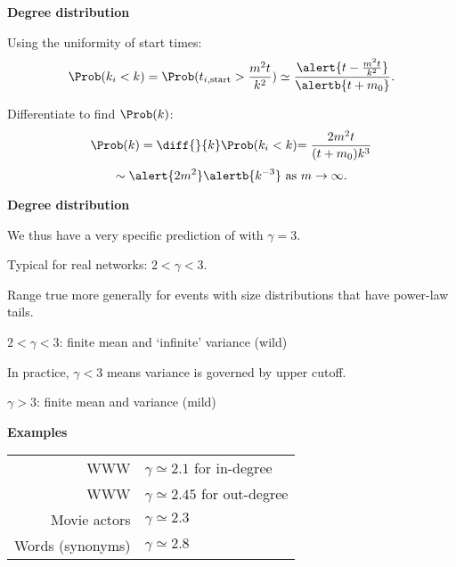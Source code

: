 \begin{frame}[label=]
\begin{frame}[label=]
\begin{frame}[label=]
\begin{frame}[label=]
\begin{frame}[label=]
\begin{frame}[label=]
\begin{frame}[label=]
\begin{frame}[label=]
\begin{frame}[label=]
\begin{frame}[label=]
 


\begin{frame}[label=]
  \textbf{Degree distribution}

  
   
    Using the uniformity of start times:
    $$
    \Prob(k_i < k)
    =
    \Prob(t_{i,\textnormal{start}} > \frac{m^2 t}{k^2})
    \simeq
    \frac{\alert{t-\frac{m^2 t}{k^2}}}{\alertb{t+m_0}}.
    $$
   
    Differentiate to find $\Prob(k)$:
    $$
    \Prob(k)
    = 
    \diff{}{k} \Prob(k_i < k)
    {
      =
      \frac{2m^2 t }{(t+m_0) k^3}
    }
    $$
    $$
    {
      \sim 
      \alert{2m^2} \alertb{k^{-3}}
      \mbox{\ as $m\rightarrow \infty$}.
    }
    $$
  


\begin{frame}[label=]
 \textbf{Degree distribution}

 
   
    We thus have a very specific prediction of 
     with \alert{$\gamma=3$}.
   
    Typical for real networks: \alert{$2 < \gamma < 3$}.
   
    Range true more generally for events with size
    distributions that have power-law tails.
  
    \alert{$2 < \gamma < 3$}: finite mean and `infinite' variance
    {\alert{(wild)}}
  
    In practice, $\gamma < 3$ means variance is governed
    by upper cutoff.
  
    \alert{$\gamma > 3$}: finite mean and variance 
    {\alert{(mild)}}
 


\begin{frame}[label=]
 \textbf{Examples}  

  \begin{center}
    \begin{tabular}{rl}
      WWW & $\gamma \simeq 2.1$ for in-degree \\
      WWW & $\gamma \simeq 2.45$ for out-degree \\
      Movie actors & $\gamma \simeq 2.3$ \\
      Words (synonyms) & $\gamma \simeq 2.8$ \\
    \end{tabular}
  \end{center}


\end{frame}
\end{frame}
\end{frame}
\end{frame}
\end{frame}
\end{frame}
\end{frame}
\end{frame}
\end{frame}
\end{frame}
\end{frame}
\end{frame}
\end{frame}
